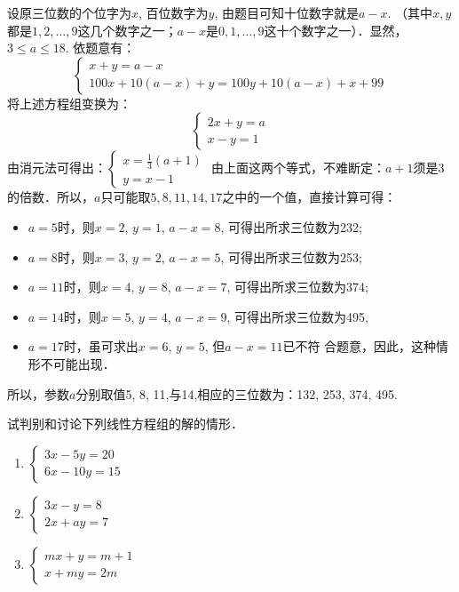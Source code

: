 \begin{solution}
设原三位数的个位字为$x$, 百位数字为$y$, 由题目可知十位数字就是$a-x$. （其中$x,y$都是$1, 2,\ldots,9$这几个数字之一；$a-x$是$0, 1,\ldots,9$这十个数字之一）．显然，$3\le a\le 18$. 依题意有：
\[\begin{cases}
    x+y=a-x\\
    100x+10(a-x)+y=100y+10(a-x)+x+99
\end{cases}\]
将上述方程组变换为：
\[\begin{cases}
    2x+y=a\\x-y=1
\end{cases}\]
由消元法可得出：$\begin{cases}
    x=\frac{1}{3}(a+1)\\ y=x-1
\end{cases}$
由上面这两个等式，不难断定：$a+1$须是3的倍数．所以，$a$只可能取$5, 8, 11, 14, 17$之中的一个值，直接计算可得：
\begin{itemize}
    \item $a=5$时，则$x=2$, $y=1$, $a-x=8$,
    可得出所求三位数为232;
\item $a=8$时，则$x=3$, $y=2$, $a-x=5$,
可得出所求三位数为253;
\item $a=11$时，则$x=4$, $y=8$, $a-x=7$,
可得出所求三位数为374;
\item $a=14$时，则$x=5$, $y=4$, $a-x=9$,
可得出所求三位数为495,
\item $a=17$时，虽可求出$x=6$, $y=5$, 但$a-x=11$已不符
合题意，因此，这种情形不可能出现．
 \end{itemize}   

所以，参数$a$分别取值5, 8, 11,与14,相应的三位数为：132, 253, 374, 495.
\end{solution}    

\begin{ex}
    试判别和讨论下列线性方程组的解的情形．
    \begin{multicols}{2}
\begin{enumerate}
    \item $\begin{cases}
        3x-5y=20\\6x-10y=15
    \end{cases}$
    \item $\begin{cases}
        3x-y=8\\2x+ay=7
    \end{cases}$
    \item $\begin{cases}
mx+y=m+1\\x+my=2m        
    \end{cases}$
\end{enumerate}        
    \end{multicols}
\end{ex}

